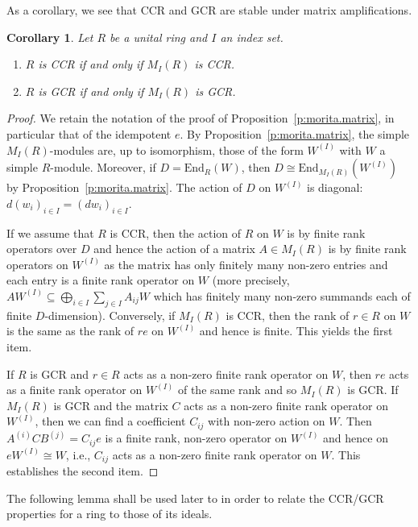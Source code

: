 \documentclass[11pt,reqno]{amsart}
\theoremstyle{plain}
\newtheorem{cor}[thm]{Corollary}
{\theoremstyle{definition}
\newtheorem{dfn}[thm]{Definition}}
{\theoremstyle{remark}
\newtheorem{ex}[thm]{Example}}
{\theoremstyle{remark}
\newtheorem*{ex*}{Example}}
{\theoremstyle{definition}
\newtheorem{note}[thm]{Note}}
{\theoremstyle{remark}
\newtheorem{remark}[thm]{Remark}}
\numberwithin{equation}{section}
\begin{document}
As a corollary, we see that CCR and GCR are stable under matrix amplifications.

\begin{cor}\label{c:matrix.amp}
Let $R$ be a unital ring and $I$ an index set.
\begin{enumerate}
\item $R$ is CCR if and only if $M_I(R)$ is CCR.
\item $R$ is GCR if and only if $M_I(R)$ is GCR.
\end{enumerate}
\end{cor}
\begin{proof}
We retain the notation of the proof of Proposition~\ref{p:morita.matrix}, in particular that of the idempotent $e$.  By Proposition~\ref{p:morita.matrix}, the simple
$M_I(R)$-modules are, up to isomorphism, those of the form $W^{(I)}$ with $W$ a simple $R$-module.  Moreover, if $D=\mathrm{End}_R(W)$, then $D\cong \mathrm{End}_{M_I(R)}(W^{(I)})$ by Proposition~\ref{p:morita.matrix}.  The action of $D$ on $W^{(I)}$ is diagonal: $d(w_i)_{i\in I} = (dw_i)_{i\in I}$.

If we assume that $R$ is CCR, then the action of $R$ on $W$ is by finite rank operators over $D$ and hence the action of a matrix $A\in M_I(R)$ is by finite rank operators on $W^{(I)}$ as the matrix has only finitely many non-zero entries and each entry is a finite rank operator on $W$ (more precisely, $AW^{(I)}\subseteq \bigoplus_{i\in I}\sum_{j\in I}A_{ij}W$ which has finitely many non-zero summands each of finite $D$-dimension).  Conversely, if $M_I(R)$ is CCR, then the rank of $r\in R$ on $W$ is the same as the rank of $re$ on $W^{(I)}$ and hence is finite. This yields the first item.

If $R$ is GCR and $r\in R$ acts as a non-zero finite rank operator on $W$, then $re$ acts as a finite rank operator on $W^{(I)}$ of the same rank and so $M_I(R)$ is GCR.  If $M_I(R)$ is GCR and the matrix $C$ acts as a non-zero finite rank operator on $W^{(I)}$, then we can find a coefficient $C_{ij}$ with non-zero action on $W$. Then $A^{(i)}CB^{(j)}=C_{ij}e$ is a finite rank, non-zero operator   on $W^{(I)}$ and hence on $eW^{(I)}\cong W$, i.e., $C_{ij}$ acts as a non-zero finite rank operator on $W$.  This establishes the second item.
\end{proof}

The following lemma shall be used later to in order to relate the CCR/GCR properties for a ring to those of its ideals.
\end{document}
